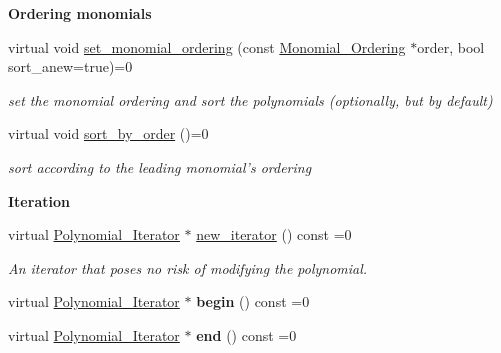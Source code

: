 \begin{Indent}\textbf{ Ordering monomials}\par
\begin{DoxyCompactItemize}
\item 
virtual void \hyperlink{group__polygroup_a12e023570eb675343c4b7ed635a031dc}{set\+\_\+monomial\+\_\+ordering} (const \hyperlink{group__orderinggroup_class_monomial___ordering}{Monomial\+\_\+\+Ordering} $\ast$order, bool sort\+\_\+anew=true)=0
\begin{DoxyCompactList}\small\item\em set the monomial ordering and sort the polynomials (optionally, but by default) \end{DoxyCompactList}\item 
virtual void \hyperlink{group__polygroup_a1fcdd29c324c660ea935197c39e682f2}{sort\+\_\+by\+\_\+order} ()=0
\begin{DoxyCompactList}\small\item\em sort according to the leading monomial's ordering \end{DoxyCompactList}\end{DoxyCompactItemize}
\end{Indent}
\begin{Indent}\textbf{ Iteration}\par
\begin{DoxyCompactItemize}
\item 
\mbox{\label{group__polygroup_a9cb8460694b7fceaa5a22ae58c73ebe7}} 
virtual \hyperlink{group___iterator_group_class_polynomial___iterator}{Polynomial\+\_\+\+Iterator} $\ast$ \hyperlink{group__polygroup_a9cb8460694b7fceaa5a22ae58c73ebe7}{new\+\_\+iterator} () const =0
\begin{DoxyCompactList}\small\item\em An iterator that poses no risk of modifying the polynomial. \end{DoxyCompactList}\item 
\mbox{\label{group__polygroup_ad8da27c2d5e41d6e81d15d756eebf868}} 
virtual \hyperlink{group___iterator_group_class_polynomial___iterator}{Polynomial\+\_\+\+Iterator} $\ast$ {\bfseries begin} () const =0
\item 
\mbox{\label{group__polygroup_aa769b074a39e5eac6526101d77e2e53f}} 
virtual \hyperlink{group___iterator_group_class_polynomial___iterator}{Polynomial\+\_\+\+Iterator} $\ast$ {\bfseries end} () const =0
\end{DoxyCompactItemize}
\end{Indent}
